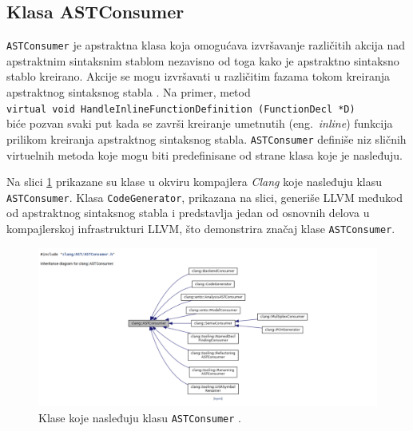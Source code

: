 \documentclass[12pt,oneside]{memoir}
\begin{document}
\subsection{Klasa ASTConsumer}

\texttt{ASTConsumer} je apstraktna klasa koja omogu\'{c}ava izvr\v{s}avanje razli\v{c}itih akcija nad apstraktnim sintaksnim stablom nezavisno od toga kako je apstraktno sintaksno stablo kreirano.
Akcije se mogu izvr\v{s}avati u razli\v{c}itim fazama tokom kreiranja apstraktnog sintaksnog stabla \cite{ASTToolTutorial}. Na primer, metod \\ \texttt{virtual void  HandleInlineFunctionDefinition (FunctionDecl *D)} \\ bi\'{c}e pozvan svaki put kada se zavr\v{s}i kreiranje umetnutih (eng.~\textit{inline}) funkcija prilikom kreiranja apstraktnog sintaksnog stabla. \texttt{ASTConsumer} defini\v{s}e niz sli\v{c}nih virtuelnih metoda koje mogu biti predefinisane od strane klasa koje je nasleđuju. \par
Na slici \ref{fig:inhDiagram} prikazane su klase u okviru kompajlera \textit{Clang} koje nasleđuju klasu \texttt{ASTConsumer}. Klasa \texttt{CodeGenerator}, prikazana na slici,
generi\v{s}e LLVM međukod od apstraktnog sintaksnog stabla i predstavlja jedan od osnovnih delova u kompajlerskoj infrastrukturi LLVM, \v{s}to demonstrira zna\v{c}aj klase \texttt{ASTConsumer}. 

\begin{figure}[!h]
\begin{center}
\includegraphics[scale=0.3]{ASTConsumer2.png}
\end{center}
\caption{Klase koje nasleđuju klasu \texttt{ASTConsumer} \cite{ASTConsumer}.}
\label{fig:inhDiagram}
\end{figure}
\end{document}
